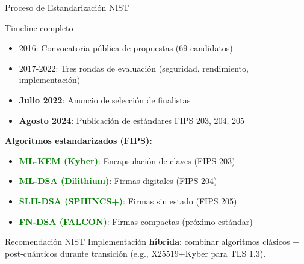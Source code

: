\documentclass[aspectratio=169]{beamer}
\begin{document}
\begin{frame}{Proceso de Estandarización NIST}
\begin{block}{Timeline completo}
\begin{itemize}
\item 2016: Convocatoria pública de propuestas (69 candidatos)
\item 2017-2022: Tres rondas de evaluación (seguridad, rendimiento, implementación)
\item \textbf{Julio 2022}: Anuncio de selección de finalistas
\item \textbf{Agosto 2024}: Publicación de estándares FIPS 203, 204, 205
\end{itemize}
\end{block}

\vspace{0.3cm}
\textbf{Algoritmos estandarizados (FIPS):}
\begin{itemize}
\item \textcolor{green}{\textbf{ML-KEM (Kyber)}}: Encapsulación de claves (FIPS 203)
\item \textcolor{green}{\textbf{ML-DSA (Dilithium)}}: Firmas digitales (FIPS 204)
\item \textcolor{green}{\textbf{SLH-DSA (SPHINCS+)}}: Firmas sin estado (FIPS 205)
\item \textcolor{green}{\textbf{FN-DSA (FALCON)}}: Firmas compactas (próximo estándar)
\end{itemize}

\vspace{0.3cm}
\begin{alertblock}{Recomendación NIST}
Implementación \textbf{híbrida}: combinar algoritmos clásicos + post-cuánticos durante transición (e.g., X25519+Kyber para TLS 1.3).
\end{alertblock}
\end{frame}
\end{document}
